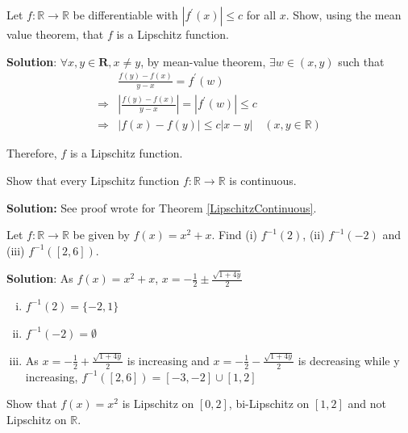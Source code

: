 \documentclass[12pt, a4paper]{article}
\begin{document}
\begin{customexercise}{1.13}
    Let $f: \mathbb{R} \rightarrow \mathbb{R}$ be differentiable 
    with $\left|f^{\prime}(x)\right| \leq c$ for all $x$. 
    Show, using the mean value theorem, that $f$ is a Lipschitz function.
\end{customexercise}

\textbf{Solution}: 
$\forall x, y \in \mathbf{R} , x \neq y$, by mean-value theorem, $\exists w \in(x, y)$ such that 
$$
\begin{aligned}
    &\frac{f(y)-f(x)}{y-x}=f^{\prime}(w) \\
    \Rightarrow  &\left|\frac{f(y)-f(x)}{y-x}\right|=\left|f^{\prime}(w)\right| \leq c \\
    \Rightarrow &|f(x)-f(y)| \leq c|x-y| \quad (x, y \in \mathbb{R})
\end{aligned}
$$

Therefore, $f$ is a Lipschitz function.


\begin{customexercise}{1.14}
    Show that every Lipschitz function 
    $f: \mathbb{R} \rightarrow \mathbb{R}$ is continuous.
\end{customexercise}

\textbf{Solution: } See proof wrote for Theorem \ref{LipschitzContinuous}.


\begin{customexercise}{1.15}
    Let $f: \mathbb{R} \rightarrow \mathbb{R}$ be given by $f(x)=x^{2}+x .$ 
    Find (i) $f^{-1}(2)$, (ii) $f^{-1}(-2)$ and (iii) $f^{-1}([2,6])$.
\end{customexercise}

\textbf{Solution}: As $f(x) = x^2 + x$, $\displaystyle x = -\frac{1}{2} \pm \frac{\sqrt{1 + 4y}}{2}$
\begin{enumerate}[(i)]
    \item $f^{-1}(2) = \{-2, 1\}$
    \item $f^{-1}(-2) = \emptyset$
    \item As $\displaystyle x = -\frac{1}{2} + \frac{\sqrt{1 + 4y}}{2}$ is increasing and $\displaystyle x = -\frac{1}{2} - \frac{\sqrt{1 + 4y}}{2}$ is decreasing while y increasing, 
     $f^{-1}([2,6]) = [-3, -2]\cup [1, 2]$
\end{enumerate}


\begin{customexercise}{1.16}
    Show that $f(x)=x^{2}$ is Lipschitz on $[0,2]$, bi-Lipschitz on 
    $[1,2]$ and not Lipschitz on $\mathbb{R}$.
\end{customexercise}
\end{document}
